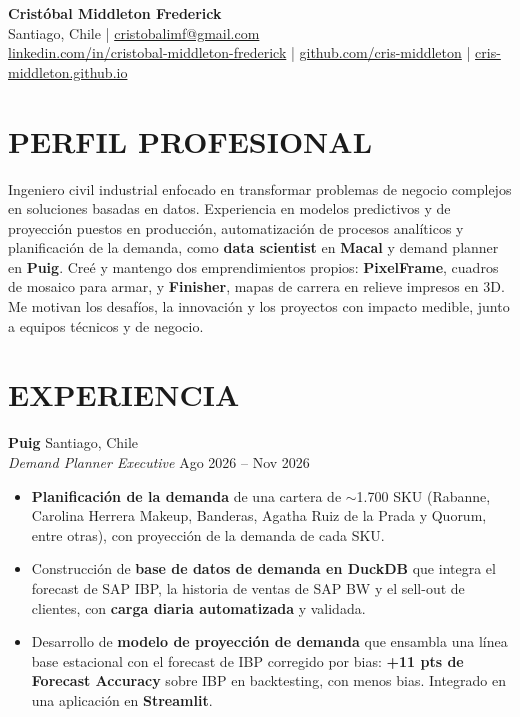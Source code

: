 \documentclass[a4paper,10.5pt]{extarticle}
\newif\ifcontelefono
\begin{document}
\pagestyle{empty}

\begin{center}
\textbf{\Large Cristóbal Middleton Frederick}\\[2pt]
Santiago, Chile | \href{mailto:cristobalimf@gmail.com}{cristobalimf@gmail.com}\ifcontelefono{} | +56 9 3363 9109\fi\\
\href{https://www.linkedin.com/in/cristobal-middleton-frederick/}{linkedin.com/in/cristobal-middleton-frederick} |
\href{https://github.com/cris-middleton}{github.com/cris-middleton} |
\href{https://cris-middleton.github.io}{cris-middleton.github.io}
\end{center}

\section*{PERFIL PROFESIONAL}

Ingeniero civil industrial enfocado en transformar problemas de negocio complejos en soluciones basadas en datos. Experiencia en modelos predictivos y de proyección puestos en producción, automatización de procesos analíticos y planificación de la demanda, como \textbf{data scientist} en \textbf{Macal} y demand planner en \textbf{Puig}. Creé y mantengo dos emprendimientos propios: \textbf{PixelFrame}, cuadros de mosaico para armar, y \textbf{Finisher}, mapas de carrera en relieve impresos en 3D. Me motivan los desafíos, la innovación y los proyectos con impacto medible, junto a equipos técnicos y de negocio.

\section*{EXPERIENCIA}

\textbf{Puig} \hfill Santiago, Chile\\
\textit{Demand Planner Executive} \hfill Ago 2026 -- Nov 2026
\begin{itemize}
    \item \textbf{Planificación de la demanda} de una cartera de $\sim$1.700 SKU (Rabanne, Carolina Herrera Makeup, Banderas, Agatha Ruiz de la Prada y Quorum, entre otras), con proyección de la demanda de cada SKU.
    \item Construcción de \textbf{base de datos de demanda en DuckDB} que integra el forecast de SAP IBP, la historia de ventas de SAP BW y el sell-out de clientes, con \textbf{carga diaria automatizada} y validada.
    \item Desarrollo de \textbf{modelo de proyección de demanda} que ensambla una línea base estacional con el forecast de IBP corregido por bias: \textbf{+11 pts de Forecast Accuracy} sobre IBP en backtesting, con menos bias. Integrado en una aplicación en \textbf{Streamlit}.
\end{itemize}
\end{document}
